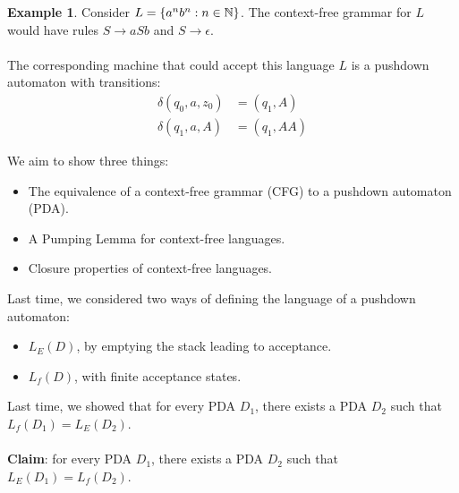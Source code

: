 \documentclass[]{article}
\DeclarePairedDelimiter{\set}{\lbrace}{\rbrace}
\theoremstyle{definition}
\newtheorem{ex}{Example}[section]
\newcommand{\lecture}[1]{\marginpar{{\footnotesize $\leftarrow$ \underline{#1}}}}
\begin{document}
        \begin{ex} \lecture{October 24, 2013}
          Consider $L = \set{a^n b^n : n \in \mathbb{N}}$. The context-free grammar for $L$ would have rules $S \to aSb$ and $S \to \epsilon$.
          \\ \\
          The corresponding machine that could accept this language $L$ is a pushdown automaton with transitions:
          \begin{align*}
            \delta(q_0, a, z_0) &= (q_1, A) \\
            \delta(q_1, a, A) &= (q_1, AA)
          \end{align*}
        \end{ex}

        We aim to show three things:
        \begin{itemize}
          \item The equivalence of a context-free grammar (CFG) to a pushdown automaton (PDA).
          \item A Pumping Lemma for context-free languages.
          \item Closure properties of context-free languages.
        \end{itemize}

        Last time, we considered two ways of defining the language of a pushdown automaton:
        \begin{itemize}
          \item $L_E(D)$, by emptying the stack leading to acceptance.
          \item $L_f(D)$, with finite acceptance states.
        \end{itemize}

        Last time, we showed that for every PDA $D_1$, there exists a PDA $D_2$ such that $L_f(D_1) = L_E(D_2)$.
        \\ \\
        \textbf{Claim}: for every PDA $D_1$, there exists a PDA $D_2$ such that $L_E(D_1) = L_f(D_2)$.
\end{document}
